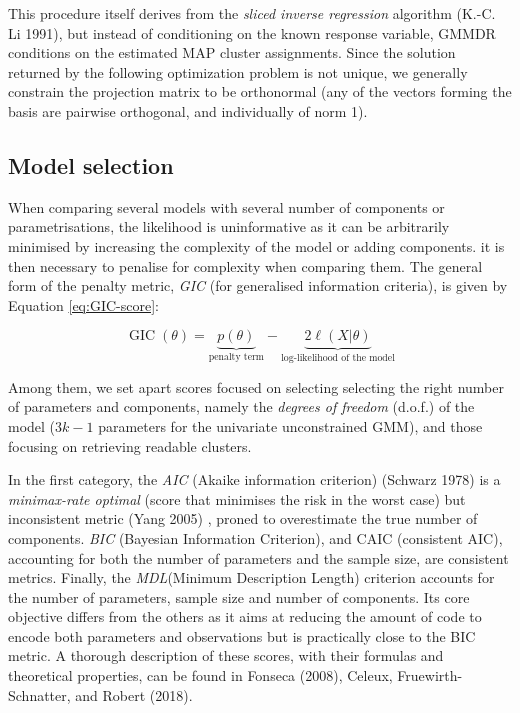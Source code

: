 This procedure itself derives from the \emph{sliced inverse regression} algorithm (K.-C. Li 1991), but instead of conditioning on the known response variable, GMMDR conditions on the estimated MAP cluster assignments. Since the solution returned by the following optimization problem is not unique, we generally constrain the projection matrix to be orthonormal (any of the vectors forming the basis are pairwise orthogonal, and individually of norm 1).
\color{black}

\hypertarget{model-selection}{%
\subsection{Model selection}\label{model-selection}}

When comparing several models with several number of components or
parametrisations, the likelihood is uninformative as it can be
arbitrarily minimised by increasing the complexity of the model or
adding components. it is then necessary to penalise for complexity when
comparing them. The general form of the penalty metric, \emph{GIC} (for
generalised information criteria), is given by Equation
\eqref{eq:GIC-score}:

\begin{equation}
    \operatorname{GIC} (\theta) =  \underbrace{p(\theta)}_{\text{penalty term}} - \underbrace{2 \ell (X | \theta)}_{\text{log-likelihood of the model}}
\label{eq:GIC-score}
\end{equation}

Among them, we set apart scores focused on selecting selecting the right
number of parameters and components, namely the \emph{degrees of freedom}
(d.o.f.) of the model (\(3k-1\) parameters for the univariate
unconstrained GMM), and those focusing on retrieving readable clusters.

In the first category, the \emph{AIC} (Akaike information criterion)
(Schwarz 1978) is a \emph{minimax-rate optimal} (score that minimises the risk
in the worst case) but inconsistent metric (Yang 2005) , proned to
overestimate the true number of components. \emph{BIC} (Bayesian Information
Criterion), and CAIC (consistent AIC), accounting for both the number of
parameters and the sample size, are consistent metrics. Finally, the
\emph{MDL}(Minimum Description Length) criterion accounts for the number of
parameters, sample size and number of components. Its core objective
differs from the others as it aims at reducing the amount of code to
encode both parameters and observations but is practically close to the
BIC metric. A thorough description of these scores, with their formulas
and theoretical properties, can be found in Fonseca (2008), Celeux, Fruewirth-Schnatter, and Robert (2018).

